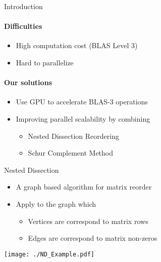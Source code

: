 \documentclass[final]{beamer}
\newlength{\sepwid}
\newlength{\onecolwid}
\begin{document}
\begin{frame}[t]
\begin{columns}[t]
\begin{column}{\onecolwid}
\begin{block}{Introduction}
          \paragraph{\textbf{Difficulties}}
          \begin{itemize}
            \item High computation cost (BLAS Level 3)
            \item Hard to parallelize
          \end{itemize}
          \paragraph{\textbf{Our solutions}}
          \begin{itemize}
            \item Use GPU to accelerate BLAS-3 operations
            \item Improving parallel scalability by combining
            \begin{itemize}
              \item Nested Dissection Reordering
              \item Schur Complement Method
            \end{itemize}
          \end{itemize}
        \end{block}

          \begin{block}{Nested Dissection}
            \begin{itemize}
              \item A graph based algorithm for matrix reorder
              \item Apply to the graph which
              \begin{itemize}
                \item Vertices are correspond to matrix rows
                \item Edges are correspond to matrix non-zeros
              \end{itemize}
            \end{itemize}
            \texttt{[image: ./ND\_Example.pdf]}
          \end{block}
      \end{column}

      \begin{column}{\sepwid}\end{column}


\end{columns}
\end{frame}
\end{document}
